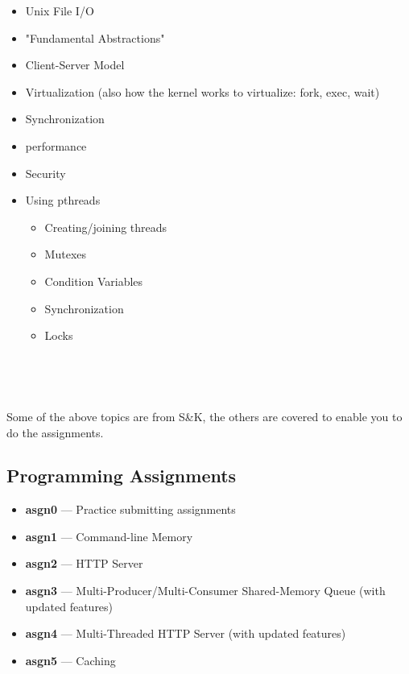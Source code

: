 \documentclass{article}
\begin{document}
\begin{minipage}[t]{0.45\textwidth} %
    \begin{itemize}
        \item Unix File I/O
        \item "Fundamental Abstractions"
        \item Client-Server Model
        \item Virtualization (also how the kernel works to virtualize: fork, exec, wait)
        \item Synchronization
        \item performance
        \item Security
    \end{itemize}
\end{minipage}%
\hfill
\begin{minipage}[t]{0.45\textwidth} %
    \begin{itemize}
        \item Using pthreads
        \begin{itemize}
            \item[$\rightarrow$] Creating/joining threads
            \item[$\rightarrow$] Mutexes
            \item[$\rightarrow$] Condition Variables
            \item[$\rightarrow$] Synchronization
            \item[$\rightarrow$] Locks
        \end{itemize}
    \end{itemize}
\end{minipage}

\

\

Some of the above topics are from S\&K, the others are covered to enable you to do the assignments.

\subsection*{Programming Assignments}

\begin{itemize}
    \item \textbf{asgn0} --- Practice submitting assignments
    \item \textbf{asgn1} --- Command-line Memory
    \item \textbf{asgn2} --- HTTP Server
    \item \textbf{asgn3} --- Multi-Producer/Multi-Consumer Shared-Memory Queue (with updated features)
    \item \textbf{asgn4} --- Multi-Threaded HTTP Server (with updated features)
    \item \textbf{asgn5} --- Caching
\end{itemize}
\end{document}
